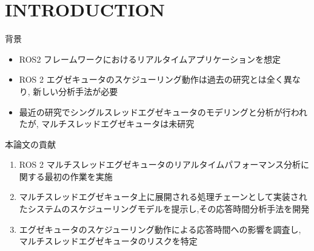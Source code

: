 
\section{INTRODUCTION}
\label{sec: introduction}

\begin{frame}{背景}
    \begin{itemize}
        \item ROS2 フレームワークにおけるリアルタイムアプリケーションを想定
        \item ROS 2 エグゼキュータのスケジューリング動作は過去の研究とは全く異なり, 新しい分析手法が必要
        \item 最近の研究でシングルスレッドエグゼキュータのモデリングと分析が行われたが, マルチスレッドエグゼキュータは未研究
    \end{itemize}
\end{frame}

\begin{frame}{本論文の貢献}
    \begin{enumerate}
        \item ROS 2 マルチスレッドエグゼキュータのリアルタイムパフォーマンス分析に関する最初の作業を実施
        \item マルチスレッドエグゼキュータ上に展開される処理チェーンとして実装されたシステムのスケジューリングモデルを提示し,その応答時間分析手法を開発
        \item エグゼキュータのスケジューリング動作による応答時間への影響を調査し, マルチスレッドエグゼキュータのリスクを特定
    \end{enumerate}
\end{frame}
